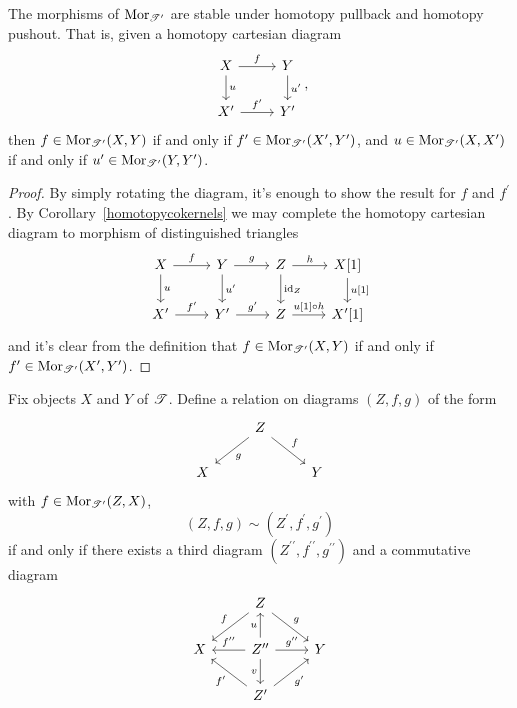 \documentclass[dissertation.tex]{subfiles}
\begin{document}
\begin{prop}[\cite{NeemanTCats}]
  The morphisms of $\operatorname{Mor}_{\mathscr{T}^\prime}$ are stable under homotopy pullback and homotopy pushout.
  That is, given a homotopy cartesian diagram
  $$\begin{tikzcd}
    X \arrow{r}{f}\arrow{d}{u} & Y \arrow{d}{u^\prime}\\
    X^\prime \arrow{r}{f^\prime} & Y^\prime
  \end{tikzcd},$$
  then 
  $f \in \operatorname{Mor}_{\mathscr{T}^\prime}(X,Y)$ 
  if and only if 
  $f^\prime \in \operatorname{Mor}_{\mathscr{T}^\prime}(X^\prime, Y^\prime)$, and
  $u \in \operatorname{Mor}_{\mathscr{T}^\prime}(X,X^\prime)$ 
  if and only if
  $u^\prime \in \operatorname{Mor}_{\mathscr{T}^\prime}(Y,Y^\prime)$.
  
  \begin{proof}
    By simply rotating the diagram, it's enough to show the result for $f$ and $f^\prime$.
    By Corollary~\ref{homotopycokernels} we may complete the homotopy cartesian diagram to morphism of distinguished triangles
    $$\begin{tikzcd}
      X \arrow{r}{f}\arrow{d}{u} & Y \arrow{r}{g}\arrow{d}{u^\prime} & Z \arrow{r}{h}\arrow{d}{\id_Z} & X[1]\arrow{d}{u[1]}\\
      X^\prime \arrow{r}{f^\prime} & Y^\prime \arrow{r}{g^\prime} & Z \arrow{r}{u[1] \circ h} & X^\prime[1]
    \end{tikzcd}$$
    and it's clear from the definition that $f \in \operatorname{Mor}_{\mathscr{T}^\prime}(X,Y)$ if and only if $f^\prime \in \operatorname{Mor}_{\mathscr{T}^\prime}(X^\prime, Y^\prime)$.
  \end{proof}
\end{prop}

\begin{defn}[\cite{NeemanTCats}]
  Fix objects $X$ and $Y$ of $\mathscr{T}$.
  Define a relation on diagrams $(Z,f,g)$ of the form 
  $$\begin{tikzcd}
    & Z\arrow{rd}{f}\arrow{ld}{g}\\
    X & & Y
  \end{tikzcd}$$
  with $f \in \operatorname{Mor}_{\mathscr{T}^\prime}(Z,X)$,
  $$(Z,f,g) \sim (Z^\prime, f^\prime, g^\prime)$$
  if and only if there exists a third diagram $(Z^{\prime\prime}, f^{\prime\prime}, g^{\prime\prime})$ and a commutative diagram
  $$\begin{tikzcd}
    & Z\arrow[swap]{ld}{f}\arrow{rd}{g}\\
    X & Z^{\prime\prime} \arrow[swap]{l}{f^{\prime\prime}}\arrow{r}{g^{\prime\prime}}\arrow{u}{u}\arrow[swap]{d}{v} & Y\\
    & Z^\prime\arrow{ul}{f^\prime}\arrow[swap]{ur}{g^\prime}
  \end{tikzcd}$$
\end{defn}
\end{document}
